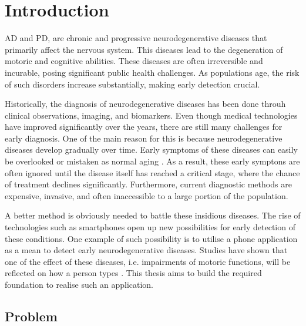 \chapter{Introduction}


\ac{AD} and \ac{PD}, are chronic and progressive neurodegenerative diseases that primarily affect the nervous system.
This diseases lead to the degeneration of motoric and cognitive abilities.
These diseases are often irreversible and incurable, posing significant public health challenges.
As populations age, the risk of such disorders increase substantially, making early detection crucial.

Historically, the diagnosis of neurodegenerative diseases has been done throuh clinical observations, imaging, and biomarkers.
Even though medical technologies have improved significantly over the years, there are still many challenges for early diagnosis.
One of the main reason for this is because neurodegenerative diseases develop gradually over time.
Early symptoms of these diseases can easily be overlooked or mistaken as normal aging \cite{manera2023}.
As a result, these early symptons are often ignored until the disease itself has reached a critical stage, where the chance of treatment declines significantly. 
Furthermore, current diagnostic methods are expensive, invasive, and often inaccessible to a large portion of the population.

A better method is obviously needed to battle these insidious diseases.
The rise of technologies such as smartphones open up new possibilities for early detection of these conditions.
One example of such possibility is to utilise a phone application as a mean to detect early neurodegenerative diseases.
Studies have shown that one of the effect of these diseases, i.e. impairments of motoric functions, will be reflected on how a person types \cite{mcisaac2023}.
This thesis aims to build the required foundation to realise such an application.

\section{Problem}


